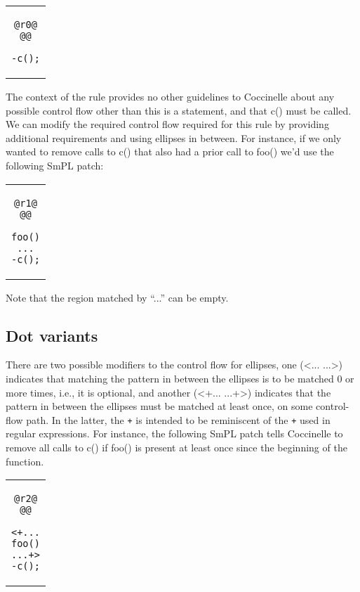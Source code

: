 \begin{center}
\begin{tabular}{c}
\begin{lstlisting}[language=Cocci]
@r0@
@@

-c();
\end{lstlisting}\\
\end{tabular}
\end{center}

The context of the rule provides no other guidelines to Coccinelle
about any possible control flow other than this is a statement, and that
c() must be called. We can modify the required control flow required for
this rule by providing additional requirements and using ellipses in between.
For instance, if we only wanted to remove calls to c() that also
had a prior call to foo() we'd use the following SmPL patch:

\begin{center}
\begin{tabular}{c}
\begin{lstlisting}[language=Cocci]
@r1@
@@

foo()
...
-c();
\end{lstlisting}\\
\end{tabular}
\end{center}

Note that the region matched by ``...'' can be empty.

\subsection{Dot variants}
There are two possible modifiers to the control flow for ellipses, one
(<... ...>) indicates that matching the pattern in between the ellipses is
to be matched 0 or more times, i.e., it is
optional, and another (<+... ...+>) indicates that the pattern in between
the ellipses must be matched at least once, on some control-flow path.  In
the latter, the \texttt{+} is intended to be reminiscent of the \texttt{+}
used in regular expressions.  For instance, the following SmPL patch tells
Coccinelle to remove all calls to c() if foo() is present at least
once since the beginning of the function.

\begin{center}
\begin{tabular}{c}
\begin{lstlisting}[language=Cocci]
@r2@
@@

<+...
foo()
...+>
-c();

\end{lstlisting}\\
\end{tabular}
\end{center}

